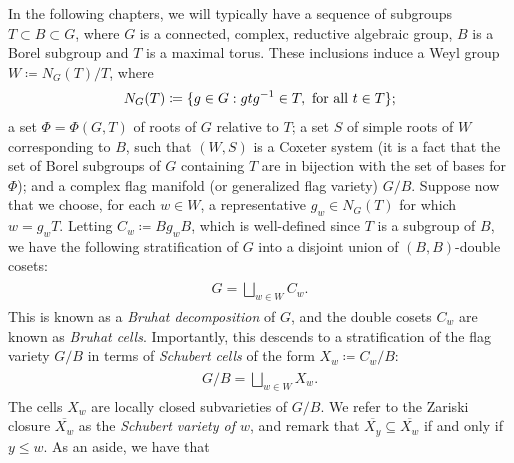 \noindent\begin{remark}\label{2Grading} In the following chapters, we will typically have a sequence of subgroups $T \subset B \subset G$, where $G$ is a connected, complex, reductive algebraic group, $B$ is a Borel subgroup and $T$ is a maximal torus. These inclusions induce a Weyl group $W \coloneqq N_G(T)/T$, where
\begin{align*}
\begin{split}
N_G(T) \coloneqq \{g \in G : gtg^{-1} \in T,\ \textup{for all $t \in T$}\};
\end{split}
\end{align*}
\noindent a set $\Phi = \Phi(G, T)$ of roots of $G$ relative to $T$; a set $S$ of simple roots of $W$ corresponding to $B$, such that $(W, S)$ is a Coxeter system (it is a fact that the set of Borel subgroups of $G$ containing $T$ are in bijection with the set of bases for $\Phi$); %
and a complex flag manifold (or generalized flag variety) $G/B$. Suppose now that we choose, for each $w \in W$, a representative $g_w \in N_G(T)$ for which $w = g_wT$. Letting $C_w \coloneqq Bg_wB$, which is well-defined since $T$ is a subgroup of $B$, we have the following stratification of $G$ into a disjoint union of $(B, B)$-double cosets:
\begin{align*}
\begin{split}
G = \bigsqcup_{w \in W} C_w.
\end{split}
\end{align*}
\noindent This is known as a {\em Bruhat decomposition} of $G$, and the double cosets $C_w$ are known as {\em Bruhat cells}. Importantly, this descends to a stratification of the flag variety $G/B$ in terms of {\em Schubert cells} of the form $X_w \coloneqq C_w/B$:
\begin{align*}
\begin{split}
G/B = \bigsqcup_{w \in W} X_w.
\end{split}
\end{align*}
\noindent The cells $X_w$ are locally closed subvarieties of $G/B$. We refer to the Zariski closure $\overline{X_w}$ as the {\em Schubert variety of $w$}, and remark that $\overline{X_y} \subseteq \overline{X_w}$ if and only if $y \leq w$. As an aside, we have that\\[-\linespacing]
\begin{align*}
\begin{split}

\end{split}
\end{align*}
\end{remark}
